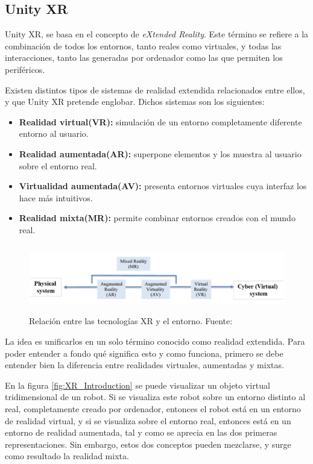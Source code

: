 \documentclass[../main.tex]{subfiles}
\begin{document}
\subsection{Unity XR} \label{UnityXR_Section}

Unity XR, se basa en el concepto de \textit{eXtended Reality}. Este término se refiere a la combinación de todos los entornos, tanto reales como virtuales, y todas las interacciones, tanto las generadas por ordenador como las que permiten los periféricos.

Existen distintos tipos de sistemas de realidad extendida relacionados entre ellos, y que Unity XR pretende englobar. Dichos sistemas son los siguientes:

\begin{itemize}
    \item \textbf{Realidad virtual(VR):} simulación de un entorno completamente diferente entorno al usuario.
    \item \textbf{Realidad aumentada(AR):} superpone elementos y los muestra al usuario sobre el entorno real.
    \item \textbf{Virtualidad aumentada(AV):}  presenta entornos virtuales cuya interfaz los hace más intuitivos.
    \item \textbf{Realidad mixta(MR):} permite combinar entornos creados con el mundo real.
\end{itemize}

\begin{figure}[h!]
\centering
\includegraphics[width=12cm, height=3cm]{imagenes/Differences_XR_Systems.png}
\caption{Relación entre las tecnologías XR y el entorno. Fuente:\cite{Differences_XR_Systems}}
\label{fig:Differences_XR_Systems}
\end{figure}

La idea es unificarlos en un solo término conocido como realidad extendida. Para poder entender a fondo qué significa esto y como funciona, primero se debe entender bien la diferencia entre realidades virtuales, aumentadas y mixtas.

En la figura \ref{fig:XR_Introduction} se puede visualizar un objeto virtual tridimensional de un robot. Si se visualiza este robot sobre un entorno distinto al real, completamente creado por ordenador, entonces el robot está en un entorno de realidad virtual, y si se visualiza sobre el entorno real, entonces está en un entorno de realidad aumentada, tal y como se aprecia en las dos primeras representaciones. Sin embargo, estos dos conceptos pueden mezclarse, y surge como resultado la realidad mixta.
\end{document}
